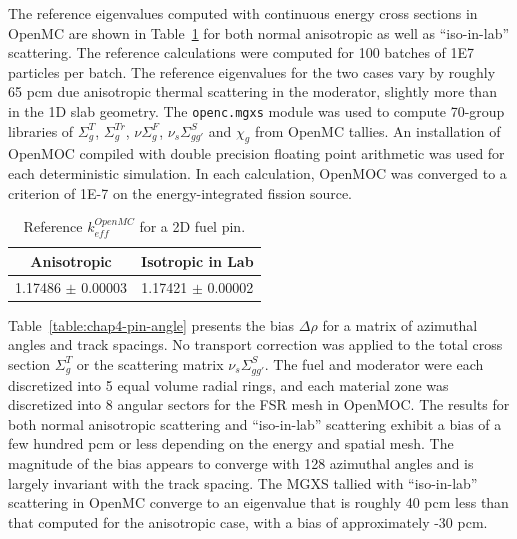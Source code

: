 The reference eigenvalues computed with continuous energy cross sections in OpenMC are shown in Table~\ref{table:chap4-pin-reference} for both normal anisotropic as well as ``iso-in-lab'' scattering. The reference calculations were computed for 100 batches of 1E7 particles per batch. The reference eigenvalues for the two cases vary by roughly 65 pcm due anisotropic thermal scattering in the moderator, slightly more than in the 1D slab geometry. The \texttt{openc.mgxs} module was used to compute 70-group libraries of $\Sigma^T_g$, $\Sigma^{Tr}_g$, $\nu\Sigma^F_g$, $\nu_s\Sigma^S_{gg'}$ and $\chi_g$ from OpenMC tallies. An installation of OpenMOC compiled with double precision floating point arithmetic was used for each deterministic simulation. In each calculation, OpenMOC was converged to a criterion of 1E-7 on the energy-integrated fission source.

\begin{table}[h!]
  \centering
  \caption{Reference $k^{OpenMC}_{eff}$ for a 2D fuel pin.}
  \label{table:chap4-pin-reference} 
  \vspace{6pt}
  \begin{tabular}{c c}
  \toprule
  \multicolumn{1}{c}{\bf Anisotropic} &
  \multicolumn{1}{c}{\bf Isotropic in Lab} \\
  \midrule
  1.17486 $\pm$ 0.00003 & 1.17421 $\pm$ 0.00002 \\
  \bottomrule
\end{tabular}
\end{table}

Table~\ref{table:chap4-pin-angle} presents the bias $\Delta\rho$ for a matrix of azimuthal angles and track spacings. No transport correction was applied to the total cross section $\Sigma^T_g$ or the scattering matrix $\nu_s\Sigma^S_{gg'}$. The fuel and moderator were each discretized into 5 equal volume radial rings, and each material zone was discretized into 8 angular sectors for the \ac{FSR} mesh in OpenMOC. The results for both normal anisotropic scattering and ``iso-in-lab'' scattering exhibit a bias of a few hundred pcm or less depending on the energy and spatial mesh. The magnitude of the bias appears to converge with 128 azimuthal angles and is largely invariant with the track spacing. The \ac{MGXS} tallied with ``iso-in-lab'' scattering in OpenMC converge to an eigenvalue that is roughly 40 pcm less than that computed for the anisotropic case, with a bias of approximately -30 pcm.

